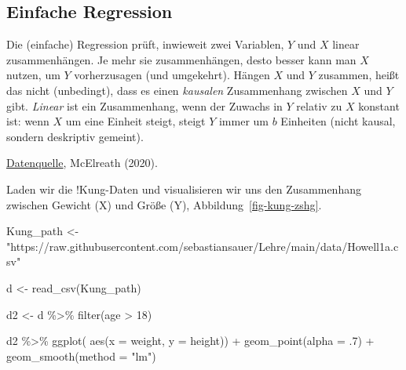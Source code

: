 \documentclass[
  a4paper,
  DIV=11]{scrreprt}
\newenvironment{Shaded}{\begin{snugshade}}{\end{snugshade}}
\newcommand{\AttributeTok}[1]{\textcolor[rgb]{0.40,0.45,0.13}{#1}}
\newcommand{\DecValTok}[1]{\textcolor[rgb]{0.68,0.00,0.00}{#1}}
\newcommand{\FunctionTok}[1]{\textcolor[rgb]{0.28,0.35,0.67}{#1}}
\newcommand{\NormalTok}[1]{\textcolor[rgb]{0.00,0.23,0.31}{#1}}
\newcommand{\OtherTok}[1]{\textcolor[rgb]{0.00,0.23,0.31}{#1}}
\newcommand{\SpecialCharTok}[1]{\textcolor[rgb]{0.37,0.37,0.37}{#1}}
\newcommand{\StringTok}[1]{\textcolor[rgb]{0.13,0.47,0.30}{#1}}
\theoremstyle{definition}
\theoremstyle{remark}
\begin{document}
\hypertarget{einfache-regression}{%
\subsection{Einfache Regression}\label{einfache-regression}}

Die (einfache) Regression prüft, inwieweit zwei Variablen, \(Y\) und
\(X\) linear zusammenhängen. Je mehr sie zusammenhängen, desto besser
kann man \(X\) nutzen, um \(Y\) vorherzusagen (und umgekehrt). Hängen
\(X\) und \(Y\) zusammen, heißt das nicht (unbedingt), dass es einen
\emph{kausalen} Zusammenhang zwischen \(X\) und \(Y\) gibt.
\emph{Linear} ist ein Zusammenhang, wenn der Zuwachs in \(Y\) relativ zu
\(X\) konstant ist: wenn \(X\) um eine Einheit steigt, steigt \(Y\)
immer um \(b\) Einheiten (nicht kausal, sondern deskriptiv gemeint).

\href{https://raw.githubusercontent.com/sebastiansauer/Lehre/main/data/Howell1a.csv}{Datenquelle},
McElreath (2020).

Laden wir die !Kung-Daten und visualisieren wir uns den Zusammenhang
zwischen Gewicht (X) und Größe (Y), Abbildung~\ref{fig-kung-zshg}.

\begin{Shaded}
\begin{Highlighting}[]
\NormalTok{Kung\_path }\OtherTok{\textless{}{-}} \StringTok{"https://raw.githubusercontent.com/sebastiansauer/Lehre/main/data/Howell1a.csv"}

\NormalTok{d }\OtherTok{\textless{}{-}} \FunctionTok{read\_csv}\NormalTok{(Kung\_path)  }

\NormalTok{d2 }\OtherTok{\textless{}{-}} 
\NormalTok{  d }\SpecialCharTok{\%\textgreater{}\%} 
  \FunctionTok{filter}\NormalTok{(age }\SpecialCharTok{\textgreater{}} \DecValTok{18}\NormalTok{) }

\NormalTok{d2 }\SpecialCharTok{\%\textgreater{}\%} 
  \FunctionTok{ggplot}\NormalTok{(}
       \FunctionTok{aes}\NormalTok{(}\AttributeTok{x =}\NormalTok{ weight, }\AttributeTok{y =}\NormalTok{ height)) }\SpecialCharTok{+}
  \FunctionTok{geom\_point}\NormalTok{(}\AttributeTok{alpha =}\NormalTok{ .}\DecValTok{7}\NormalTok{) }\SpecialCharTok{+}
  \FunctionTok{geom\_smooth}\NormalTok{(}\AttributeTok{method =} \StringTok{"lm"}\NormalTok{)}
\end{Highlighting}
\end{Shaded}
\end{document}
